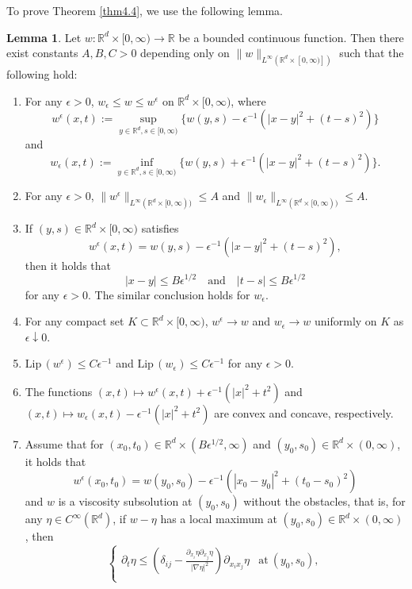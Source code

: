 \documentclass{amsart}
\theoremstyle{definition}
\newtheorem{lemma}[definition]{Lemma}
\def\R{{\mathbb{R}}}
\begin{document}
To prove Theorem \ref{thm4.4}, we use the following lemma. 
\begin{lemma}\label{Lem5.5}
Let $w:\R^d \times [0,\infty) \to \R$ be a bounded continuous function. Then there exist constants $A,B,C>0$ depending only on $\| w \|_{L^\infty (\R^d \times [0,\infty)])}$ such that the following hold:
\begin{enumerate}
\item For any $\epsilon >0$, $w_\epsilon \leq w \leq w^\epsilon$ on $\R^d \times [0,\infty)$, where 
\[
w^\epsilon (x,t)
:=
\sup_{y\in \R^d, s \in [0,\infty)} \{
w(y,s) - \epsilon ^{-1}
(|x-y|^2 + (t-s)^2)
\} 
\]
and
\[
w_\epsilon (x,t)
:=
\inf_{y\in \R^d, s \in [0,\infty)} \{
w(y,s) + \epsilon ^{-1}
(|x-y|^2 + (t-s)^2)
\} .
\]
\item For any $\epsilon >0$,
$\| w^\epsilon  \|_{L^\infty (\R^d\times [0,\infty))} \leq A$ and
$\| w_\epsilon  \|_{L^\infty (\R^d\times [0,\infty))} \leq A$.
\item If $(y,s) \in \R^d \times [0,\infty)$ satisfies 
\[
w^\epsilon (x,t)
= w(y,s) -\epsilon^{-1} (|x-y|^2 + (t-s)^2),
\]
then it holds that
\[
|x-y|\leq B\epsilon^{1/2}
\quad 
\text{and}
\quad
|t-s|\leq B\epsilon^{1/2}
\]
for any $\epsilon >0$.
The similar conclusion holds for $w_\epsilon$.
\item For any compact set $K \subset \R^d \times [0,\infty)$, $w^\epsilon \to w$ and $w_\epsilon \to w$ uniformly on $K$ as $\epsilon \downarrow 0$. 
\item $\mathrm{Lip} \, (w^\epsilon ) \leq C\epsilon ^{-1}$ and
$\mathrm{Lip} \, (w_\epsilon ) \leq C\epsilon ^{-1}$ for any $\epsilon >0$.
\item The functions
$(x,t)\mapsto w^\epsilon (x,t) +\epsilon ^{-1} (|x|^2 +t^2)$ and
$(x,t)\mapsto w_\epsilon (x,t) -\epsilon ^{-1} (|x|^2 +t^2)$ are
convex and concave, respectively.
\item Assume that for $(x_0,t_0) \in \R^d \times (B\epsilon^{1/2},\infty)$
and $(y_0,s_0) \in \R^d \times (0,\infty)$, it holds that
\[
w^\epsilon (x_0, t_0)
= w(y_0,s_0)-\epsilon ^{-1}
(|x_0 -y_0 | ^2 + (t_0 -s_0)^2)
\]
and $w$ is a viscosity subsolution at $(y_0,s_0)$ without the obstacles, 
that is, 
for any $\eta \in C^\infty (\R^d)$, if $w-\eta$ has a local maximum at $(y_0,s_0) \in \R^d \times (0,\infty)$, then 
    \begin{equation*}
    \left\{ 
\begin{array}{ll}
\partial _t \eta \leq \left( 
\delta_{ij} -\frac{\partial_{x_i} \eta \partial _{x_j} \eta}{|\nabla \eta|^2} \right)
\partial_{x_i x_j}\eta & \text{at} \ (y_0,s_0), \\

\end{array}
\end{equation*}
\end{enumerate}
\end{lemma}
\end{document}
